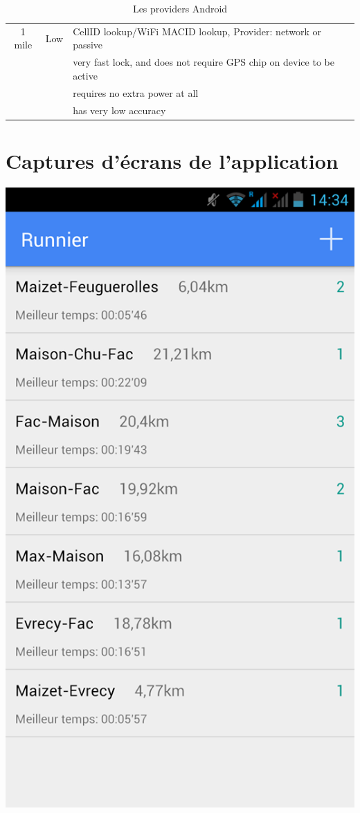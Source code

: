 \begin{appendices}
\begin{table}[H]
\begin{center}
\begin{tabular}{| c | c | l | }
    1 mile & Low & CellID lookup/WiFi MACID lookup, Provider: network or passive \\
     && very fast lock, and does not require GPS chip on device to be active \\
	 && requires no extra power at all \\ 
     && has very low accuracy \\
     \hline
   \end{tabular}   
 \end{center}
\caption{Les providers Android}
\end{table}
\chapter{Captures d'écrans de l'application}
\label{Annexe3}
\begin{multicols}{3}
\begin{img}
  \includegraphics[scale=0.28]{img/home.jpg}

\end{img}
\end{multicols}
\end{appendices}
